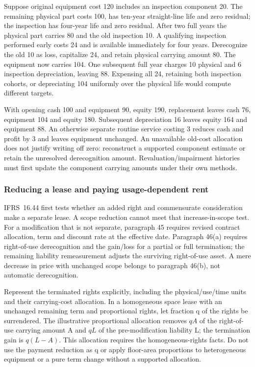 Suppose original equipment cost 120 includes an inspection component 20. The remaining physical part costs 100, has ten-year straight-line life and zero residual; the inspection has four-year life and zero residual. After two full years the physical part carries 80 and the old inspection 10. A qualifying inspection performed early costs 24 and is available immediately for four years. Derecognize the old 10 as loss, capitalize 24, and retain physical carrying amount 80. The equipment now carries 104. One subsequent full year charges 10 physical and 6 inspection depreciation, leaving 88. Expensing all 24, retaining both inspection cohorts, or depreciating 104 uniformly over the physical life would compute different targets.

With opening cash 100 and equipment 90, equity 190, replacement leaves cash 76, equipment 104 and equity 180. Subsequent depreciation 16 leaves equity 164 and equipment 88. An otherwise separate routine service costing 3 reduces cash and profit by 3 and leaves equipment unchanged. An unavailable old-cost allocation does not justify writing off zero: reconstruct a supported component estimate or retain the unresolved derecognition amount. Revaluation/impairment histories must first update the component carrying amounts under their own methods.

\hypertarget{reducing-a-lease-and-paying-usage-dependent-rent}{%
\subsubsection{Reducing a lease and paying usage-dependent rent}\label{reducing-a-lease-and-paying-usage-dependent-rent}}

IFRS~16.44 \citep[IFRS~16.38--46]{eu20231803} first tests whether an added right and commensurate consideration make a separate lease. A scope reduction cannot meet that increase-in-scope test. For a modification that is not separate, paragraph 45 requires revised contract allocation, term and discount rate at the effective date. Paragraph 46(a) requires right-of-use derecognition and the gain/loss for a partial or full termination; the remaining liability remeasurement adjusts the surviving right-of-use asset. A mere decrease in price with unchanged scope belongs to paragraph 46(b), not automatic derecognition.

Represent the terminated rights explicitly, including the physical/use/time units and their carrying-cost allocation. In a homogeneous space lease with an unchanged remaining term and proportional rights, let fraction q of the rights be surrendered. The illustrative proportional allocation removes \(qA\) of the right-of-use carrying amount A and \(qL\) of the pre-modification liability L; the termination gain is \(q(L-A)\). This allocation requires the homogeneous-rights facts. Do not use the payment reduction as q or apply floor-area proportions to heterogeneous equipment or a pure term change without a supported allocation.

